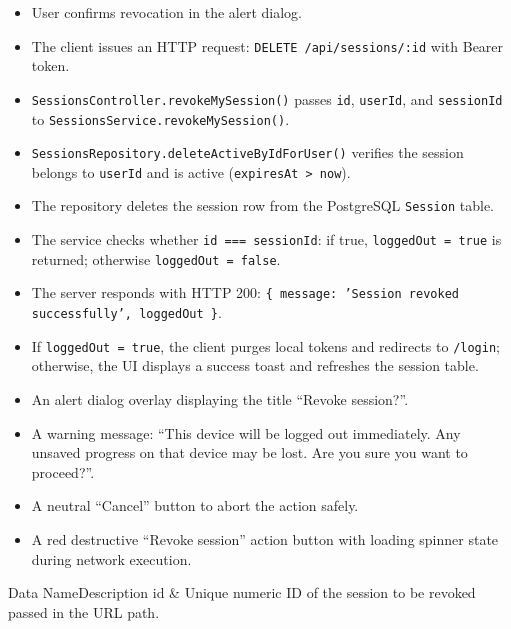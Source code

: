 \begin{itemize}[leftmargin=1.6em,topsep=3pt,itemsep=2pt,parsep=0pt,label=$\bullet$]
    \item User confirms revocation in the alert dialog.
    \item The client issues an HTTP request: \texttt{DELETE /api/sessions/:id} with Bearer token.
    \item \texttt{SessionsController.revokeMySession()} passes \texttt{id}, \texttt{userId}, and \texttt{sessionId} to \texttt{SessionsService.revokeMySession()}.
    \item \texttt{SessionsRepository.deleteActiveByIdForUser()} verifies the session belongs to \texttt{userId} and is active (\texttt{expiresAt > now}).
    \item The repository deletes the session row from the PostgreSQL \texttt{Session} table.
    \item The service checks whether \texttt{id === sessionId}: if true, \texttt{loggedOut = true} is returned; otherwise \texttt{loggedOut = false}.
    \item The server responds with HTTP 200: \texttt{\{ message: 'Session revoked successfully', loggedOut \}}.
    \item If \texttt{loggedOut = true}, the client purges local tokens and redirects to \texttt{/login}; otherwise, the UI displays a success toast and refreshes the session table.
\end{itemize}

\begin{itemize}[leftmargin=1.6em,topsep=3pt,itemsep=2pt,parsep=0pt,label=$\bullet$]
    \item An alert dialog overlay displaying the title ``Revoke session?''.
    \item A warning message: ``This device will be logged out immediately. Any unsaved progress on that device may be lost. Are you sure you want to proceed?''.
    \item A neutral ``Cancel'' button to abort the action safely.
    \item A red destructive ``Revoke session'' action button with loading spinner state during network execution.
\end{itemize}


\begin{specdatatable}{Data Name}{Description}
id & Unique numeric ID of the session to be revoked passed in the URL path.\\ \hline
\end{specdatatable}

